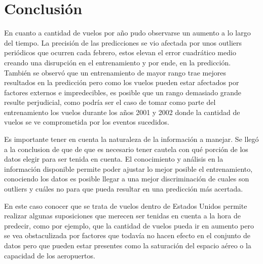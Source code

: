 \section{Conclusión}

En cuanto a cantidad de vuelos por año pudo observarse un aumento a lo largo del tiempo. La precisión de las predicciones se vio afectada por unos outliers periódicos que ocurren cada febrero, estos elevan el error cuadrático medio creando una disrupción en el entrenamiento y por ende, en la predicción. También se observó que un entrenamiento de mayor rango trae mejores resultados en la predicción pero como los vuelos pueden estar afectados por factores externos e impredecibles, es posible que un rango demasiado grande resulte perjudicial, como podría ser el caso de tomar como parte del entrenamiento los vuelos durante los años 2001 y 2002 donde la cantidad de vuelos se ve comprometida por los eventos sucedidos.

Es importante tener en cuenta la naturaleza de la información a manejar. Se llegó a la conclusion de que de que es necesario tener cautela con qué porción de los datos elegir para ser tenida en cuenta. El conocimiento y análisis en la información disponible permite poder ajustar lo mejor posible el entrenamiento, conociendo los datos es posible llegar a una mejor discriminación de cuales son outliers y cuáles no para que pueda resultar en una predicción más acertada.

En este caso conocer que se trata de vuelos dentro de Estados Unidos permite realizar algunas suposiciones que merecen ser tenidas en cuenta a la hora de predecir, como por ejemplo, que la cantidad de vuelos pueda ir en aumento pero se vea obstaculizada por factores que todavía no hacen efecto en el conjunto de datos pero que pueden estar presentes como la saturación del espacio aéreo o la capacidad de los aeropuertos.